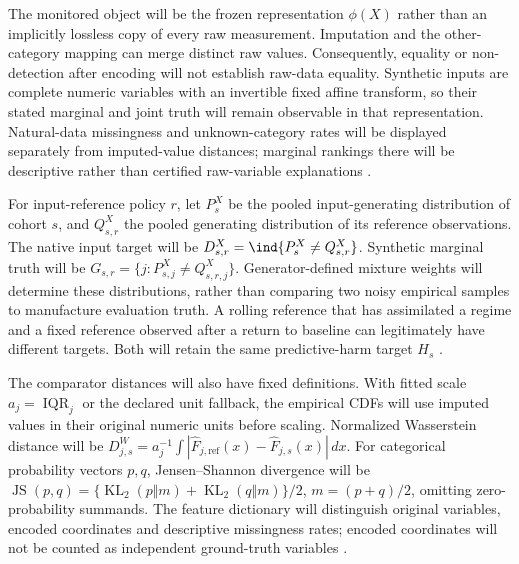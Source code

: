 The monitored object will be the frozen representation $\phi(X)$ rather than an implicitly lossless copy of every raw measurement. Imputation and the other-category mapping can merge distinct raw values. Consequently, equality or non-detection after encoding will not establish raw-data equality. Synthetic inputs are complete numeric variables with an invertible fixed affine transform, so their stated marginal and joint truth will remain observable in that representation. Natural-data missingness and unknown-category rates will be displayed separately from imputed-value distances; marginal rankings there will be descriptive rather than certified raw-variable explanations \cite{gretton,szucs,souza}.

For input-reference policy $r$, let $P_s^X$ be the pooled input-generating distribution of cohort $s$, and $Q_{s,r}^X$ the pooled generating distribution of its reference observations. The native input target will be $D_{s,r}^X=\ind\{P_s^X\ne Q_{s,r}^X\}$. Synthetic marginal truth will be $G_{s,r}=\{j:P_{s,j}^X\ne Q_{s,r,j}^X\}$. Generator-defined mixture weights will determine these distributions, rather than comparing two noisy empirical samples to manufacture evaluation truth. A rolling reference that has assimilated a regime and a fixed reference observed after a return to baseline can legitimately have different targets. Both will retain the same predictive-harm target $H_s$ \cite{window,cerqueira}.

The comparator distances will also have fixed definitions. With fitted scale $a_j=\operatorname{IQR}_j$ or the declared unit fallback, the empirical CDFs will use imputed values in their original numeric units before scaling. Normalized Wasserstein distance will be $D^W_{j,s}=a_j^{-1}\int|\widehat F_{j,\mathrm{ref}}(x)-\widehat F_{j,s}(x)|\,dx$. For categorical probability vectors $p,q$, Jensen--Shannon divergence will be $\operatorname{JS}(p,q)=\{\operatorname{KL}_2(p\Vert m)+\operatorname{KL}_2(q\Vert m)\}/2$, $m=(p+q)/2$, omitting zero-probability summands. The feature dictionary will distinguish original variables, encoded coordinates and descriptive missingness rates; encoded coordinates will not be counted as independent ground-truth variables \cite{szucs,gretton}.

